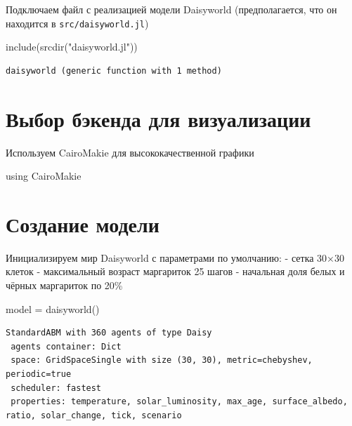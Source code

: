 \documentclass[
  12pt,
  a4paper,
  DIV=11,
  numbers=noendperiod]{scrreprt}
\newenvironment{Shaded}{\begin{snugshade}}{\end{snugshade}}
\newcommand{\BuiltInTok}[1]{\textcolor[rgb]{0.00,0.23,0.31}{#1}}
\newcommand{\FunctionTok}[1]{\textcolor[rgb]{0.28,0.35,0.67}{#1}}
\newcommand{\ImportTok}[1]{\textcolor[rgb]{0.00,0.46,0.62}{#1}}
\newcommand{\NormalTok}[1]{\textcolor[rgb]{0.00,0.23,0.31}{#1}}
\newcommand{\OperatorTok}[1]{\textcolor[rgb]{0.37,0.37,0.37}{#1}}
\newcommand{\StringTok}[1]{\textcolor[rgb]{0.13,0.47,0.30}{#1}}
\begin{document}
Подключаем файл с реализацией модели Daisyworld (предполагается, что он
находится в \texttt{src/daisyworld.jl})

\begin{Shaded}
\begin{Highlighting}[]
\FunctionTok{include}\NormalTok{(}\FunctionTok{srcdir}\NormalTok{(}\StringTok{"daisyworld.jl"}\NormalTok{))}
\end{Highlighting}
\end{Shaded}

\begin{verbatim}
daisyworld (generic function with 1 method)
\end{verbatim}

\section{Выбор бэкенда для
визуализации}\label{ux432ux44bux431ux43eux440-ux431ux44dux43aux435ux43dux434ux430-ux434ux43bux44f-ux432ux438ux437ux443ux430ux43bux438ux437ux430ux446ux438ux438}

Используем CairoMakie для высококачественной графики

\begin{Shaded}
\begin{Highlighting}[]
\ImportTok{using} \BuiltInTok{CairoMakie}
\end{Highlighting}
\end{Shaded}

\section{Создание
модели}\label{ux441ux43eux437ux434ux430ux43dux438ux435-ux43cux43eux434ux435ux43bux438}

Инициализируем мир Daisyworld с параметрами по умолчанию: - сетка 30×30
клеток - максимальный возраст маргариток 25 шагов - начальная доля белых
и чёрных маргариток по 20\%

\begin{Shaded}
\begin{Highlighting}[]
\NormalTok{model }\OperatorTok{=} \FunctionTok{daisyworld}\NormalTok{()}
\end{Highlighting}
\end{Shaded}

\begin{verbatim}
StandardABM with 360 agents of type Daisy
 agents container: Dict
 space: GridSpaceSingle with size (30, 30), metric=chebyshev, periodic=true
 scheduler: fastest
 properties: temperature, solar_luminosity, max_age, surface_albedo, ratio, solar_change, tick, scenario
\end{verbatim}
\end{document}
